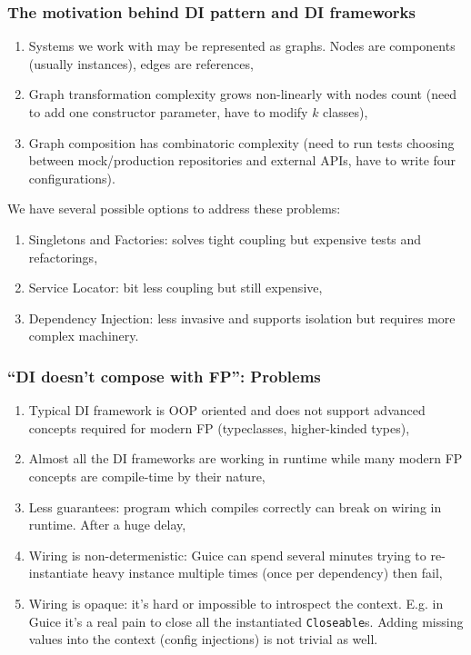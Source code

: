 \documentclass[usenames,dvipsnames]{beamer}
\begin{document}
\begin{frame}
\frametitle{The motivation behind DI pattern and DI frameworks}
\begin{enumerate}
\item Systems we work with may be represented as graphs. Nodes are components (usually instances), edges are references,
\item Graph transformation complexity grows non-linearly with nodes count (need to add one constructor parameter, have to modify $k$ classes),
\item Graph composition has combinatoric complexity (need to run tests choosing between mock/production repositories and external APIs, have to write four configurations).
\end{enumerate}

We have several possible options to address these problems:

\begin{enumerate}
\item Singletons and Factories: solves tight coupling but expensive tests and refactorings,
\item Service Locator: bit less coupling but still expensive,
\item Dependency Injection: less invasive and supports isolation but requires more complex machinery.
\end{enumerate}

\end{frame}

\begin{frame}
\frametitle{``DI doesn't compose with FP'': Problems}
\begin{enumerate}
\item Typical DI framework is OOP oriented and does not support advanced concepts required for modern FP (typeclasses, higher-kinded types),
\item Almost all the DI frameworks are working in runtime while many modern FP concepts are compile-time by their nature,
\item Less guarantees: program which compiles correctly can break on wiring in runtime. After a huge delay,
\item Wiring is non-determenistic: Guice can spend several minutes trying to re-instantiate heavy instance multiple times (once per dependency) then fail,
\item Wiring is opaque: it's hard or impossible to introspect the context. E.g. in Guice it's a real pain to close all the instantiated \texttt{Closeable}s.
      Adding missing values into the context (config injections) is not trivial as well.
\end{enumerate}
\end{frame}
\end{document}

